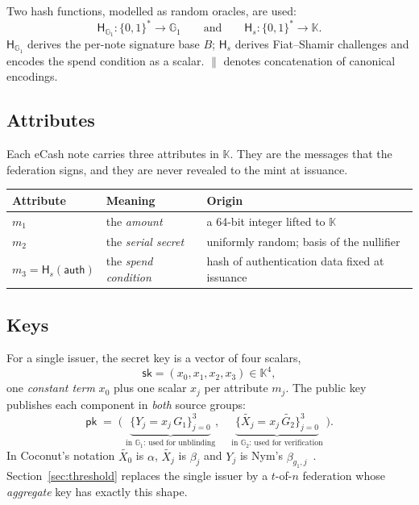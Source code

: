 \documentclass[10pt,a5paper]{article}
\newcommand{\wAttr}{4.6cm}\newcommand{\wSym}{5.2cm}\newcommand{\wSec}{6.8cm}
\newcommand{\tabsize}{\small}\newcommand{\legendsize}{\footnotesize}
\newcommand{\wAttr}{7.5cm}\newcommand{\wSym}{7.4cm}\newcommand{\wSec}{10.5cm}
\newcommand{\tabsize}{}\newcommand{\legendsize}{\small}
\newcommand{\K}[1]{#1}                      %
\newcommand{\Go}[1]{#1}                     %
\newcommand{\Gt}[1]{\tilde{#1}}             %
\newcommand{\K}[1]{{\color{ScalarCol}#1}}   %
\newcommand{\Go}[1]{{\color{GoneCol}#1}}    %
\newcommand{\Gt}[1]{{\color{GtwoCol}#1}}    %
\newcommand{\F}{\mathbb{K}}
\newcommand{\GG}[1]{\mathbb{G}_{#1}}
\newcommand{\Hs}{\mathsf{H}_{s}}
\newcommand{\Hg}{\mathsf{H}_{\GG{1}}}
\newcommand{\auth}{\mathsf{auth}}
\begin{document}
Two hash functions, modelled as random oracles, are used:
\[
  \Hg : \{0,1\}^* \to \GG{1} \qquad\text{and}\qquad \Hs : \{0,1\}^* \to \F .
\]
$\Hg$ derives the per-note signature base $\Go{B}$; $\Hs$ derives
Fiat--Shamir challenges and encodes the spend condition as a scalar. $\|$
denotes concatenation of canonical encodings.

\subsection{Attributes}

Each eCash note carries three attributes in $\F$. They are the messages that
the federation signs, and they are never revealed to the mint at issuance.

\begin{center}
\tabsize
\begin{tabular}{@{}llp{\wAttr}@{}}
\toprule
Attribute & Meaning & Origin \\
\midrule
$\K{m_1}$ & the \emph{amount} & a 64-bit integer lifted to $\F$ \\
$\K{m_2}$ & the \emph{serial secret} & uniformly random; basis of the nullifier \\
$\K{m_3} = \Hs(\auth)$ & the \emph{spend condition} & hash of authentication data fixed at issuance \\
\bottomrule
\end{tabular}
\end{center}

\subsection{Keys}

For a single issuer, the secret key is a vector of four scalars,
\[
  \mathsf{sk} = (\K{x_0}, \K{x_1}, \K{x_2}, \K{x_3}) \in \F^4,
\]
one \emph{constant term} $\K{x_0}$ plus one scalar $\K{x_j}$ per attribute
$\K{m_j}$. The public key publishes each component in \emph{both} source groups:
\[
  \mathsf{pk} \;=\; \bigl(\;
    \underbrace{\{\Go{Y_j} = \K{x_j}\,\Go{G_1}\}_{j=0}^{3}}_{\text{in } \GG{1}\text{: used for unblinding}},\quad
    \underbrace{\{\Gt{X_j} = \K{x_j}\,\Gt{G_2}\}_{j=0}^{3}}_{\text{in } \GG{2}\text{: used for verification}}
  \;\bigr).
\]
In Coconut's notation $\Gt{X_0}$ is $\alpha$, $\Gt{X_j}$ is $\beta_j$ and
$\Go{Y_j}$ is Nym's $\beta_{g_1,j}$~\cite{nymcode}.
Section~\ref{sec:threshold} replaces the single issuer by a $t$-of-$n$
federation whose \emph{aggregate} key has exactly this shape.
\end{document}
